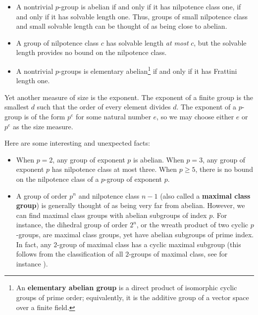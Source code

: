 \documentclass{amsart}
\renewcommand{\definedind}[1]{{\bf #1}}
\begin{document}
\begin{itemize}

\item A nontrivial $p$-group is abelian if and only if it has
  nilpotence class one, if and only if it has solvable length
  one. Thus, groups of small nilpotence class and small solvable
  length can be thought of as being close to abelian.

\item A group of nilpotence class $c$ has solvable length {\em at
    most} $c$, but the solvable length provides no bound on the
  nilpotence class.

\item A nontrivial $p$-groups is elementary abelian\footnote{An
    \definedind{elementary abelian group} is a direct product of
    isomorphic cyclic groups of prime order; equivalently, it is the
    additive group of a vector space over a finite field.} if and only
  if it has Frattini length one.

\end{itemize}

Yet another measure of size is the exponent. The exponent of a finite
group is the smallest $d$ such that the order of every element divides
$d$. The exponent of a $p$-group is of the form $p^e$ for some natural
number $e$, so we may choose either $e$ or $p^e$ as the size measure.

Here are some interesting and unexpected facts:

\begin{itemize}

\item When $p = 2$, any group of exponent $p$ is abelian. When $p =
  3$, any group of exponent $p$ has nilpotence class at most
  three. When $p \ge 5$, there is no bound on the nilpotence class of
  a $p$-group of exponent $p$.

\item A group of order $p^n$ and nilpotence class $n-1$ (also called a
  \definedind{maximal class group}) is generally thought of as being
  very far from abelian. However, we can find maximal class groups
  with abelian subgroups of index $p$. For instance, the dihedral
  group of order $2^n$, or the wreath product of two cyclic
  $p$-groups, are maximal class groups, yet have abelian subgroups of
  prime index. In fact, any $2$-group of maximal class has a cyclic
  maximal subgroup (this follows from the classification of all
  $2$-groups of maximal class, see for instance \cite[Theorem 5.4.5,
  Page 194--195]{gorenstein}).

\end{itemize}
\end{document}
